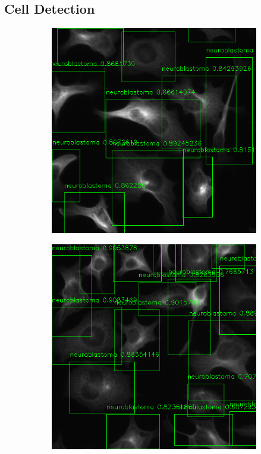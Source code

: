 \documentclass[10pt, journal, compsoc]{IEEEtran}
\begin{document}
\subsection{Cell Detection}
\begin{figure}
\centering
\begin{subfigure}[b]{0.49\linewidth}
\includegraphics[width=\linewidth]{110084.png}
\caption{}
\end{subfigure}\vspace{2pt}
\begin{subfigure}[b]{0.49\linewidth}
\includegraphics[width=\linewidth]{110085.png}

\end{subfigure}
\end{figure}
\end{document}
